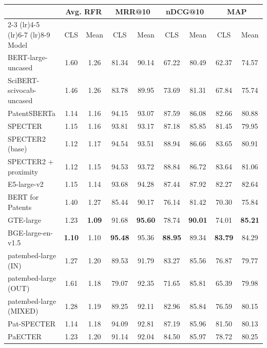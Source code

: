 \begin{tabular}{l cc cc cc cc}
    \toprule
    & \multicolumn{2}{c}{Avg. RFR} & \multicolumn{2}{c}{MRR@10} & \multicolumn{2}{c}{nDCG@10} & \multicolumn{2}{c}{MAP} \\
    \cmidrule(lr){2-3} \cmidrule(lr){4-5} \cmidrule(lr){6-7} \cmidrule(lr){8-9}
Model & CLS & Mean & CLS & Mean & CLS & Mean & CLS & Mean \\
    \midrule
    BERT-large-uncased & 1.60 & 1.26 & 81.34 & 90.14 & 67.22 & 80.49 & 62.37 & 74.57 \\
    SciBERT-scivocab-uncased & 1.46 & 1.26 & 83.78 & 89.95 & 73.69 & 81.31 & 67.84 & 75.74 \\
    PatentSBERTa & 1.14 & 1.16 & 94.15 & 93.07 & 87.59 & 86.08 & 82.66 & 80.88 \\
    SPECTER & 1.15 & 1.16 & 93.81 & 93.17 & 87.18 & 85.85 & 81.45 & 79.95 \\
    SPECTER2 (base) & 1.12 & 1.17 & 94.54 & 93.51 & 88.94 & 86.66 & 83.65 & 80.91 \\
    SPECTER2 + proximity & 1.12 & 1.15 & 94.53 & 93.72 & 88.84 & 86.72 & 83.64 & 81.06 \\
    E5-large-v2 & 1.15 & 1.14 & 93.68 & 94.28 & 87.44 & 87.92 & 82.27 & 82.64 \\
    BERT for Patents & 1.40 & 1.27 & 85.44 & 90.17 & 76.14 & 81.42 & 70.30 & 75.84 \\
    GTE-large & 1.23 & \textbf{1.09} & 91.68 & \textbf{95.60} & 78.74 & \textbf{90.01} & 74.01 & \textbf{85.21} \\
    BGE-large-en-v1.5 & \textbf{1.10} & 1.10 & \textbf{95.48} & 95.36 & \textbf{88.95} & 89.34 & \textbf{83.79} & 84.29 \\
    patembed-large (IN) & 1.27 & 1.20 & 89.53 & 91.79 & 83.27 & 85.56 & 76.87 & 79.77 \\
    patembed-large (OUT) & 1.61 & 1.18 & 79.07 & 92.35 & 71.65 & 85.81 & 65.39 & 79.98 \\
    patembed-large (MIXED) & 1.28 & 1.19 & 89.25 & 92.11 & 82.96 & 85.84 & 76.59 & 80.15 \\
    Pat-SPECTER & 1.14 & 1.18 & 94.09 & 92.81 & 87.19 & 85.96 & 81.50 & 80.13 \\
    PaECTER & 1.23 & 1.20 & 91.14 & 92.04 & 84.50 & 85.97 & 78.72 & 80.25 \\
    \bottomrule
\end{tabular}
